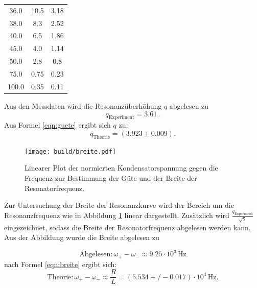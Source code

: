 \begin{table}
\begin{tabular}{ccc}
		36.0                        & 10.5                      & 3.18                      \\
		38.0                        & 8.3                       & 2.52                      \\
		40.0                        & 6.5                       & 1.86                      \\
		45.0                        & 4.0                       & 1.14                      \\
		50.0                        & 2.8                       & 0.8                       \\
		75.0                        & 0.75                      & 0.23                      \\
		100.0                       & 0.35                      & 0.11                      \\
		\bottomrule
	\end{tabular}
\end{table}

Aus den Messdaten wird die Resonanzüberhöhung $q$ abgelesen zu
\begin{equation*}
	q_\mathrm{Experiment}= 3.61 \, .
\end{equation*}
Aus Formel \eqref{eqn:guete} ergibt sich $q$ zu:
\begin{equation*}
	q_\mathrm{Theorie}= (3.923 \pm 0.009) .
\end{equation*}

\begin{figure}
	\texttt{[image: build/breite.pdf]}
	\caption{Linearer Plot der normierten Kondensatorspannung gegen die Frequenz zur Bestimmung der Güte und der Breite der Resonatorfrequenz.}
	\label{fig:breite}
\end{figure}
Zur Untersuchung der Breite der Resonanzkurve wird der Bereich um die Resonanzfrequenz
wie in Abbildung \ref{fig:breite} linear dargestellt.
Zusätzlich wird $\frac{q_\mathrm{Experiment}}{\sqrt{2}}$ eingezeichnet, sodass die Breite der Resonatorfrequenz abgelesen werden kann.
Aus der Abbildung wurde die Breite abgelesen zu

\begin{equation*}
	\text{Abgelesen}: \omega_+ - \omega_- \approx 9.25 \cdot 10^{3} \,\si{\Hz}
\end{equation*}
nach Formel \eqref{eqn:breite} ergibt sich:
\begin{equation*}
	\text{Theorie}: 	\omega_+ - \omega_- \approx \frac{R}{L}=(5.534+/-0.017) \cdot 10^{4} \,\si{\Hz} .
\end{equation*}
